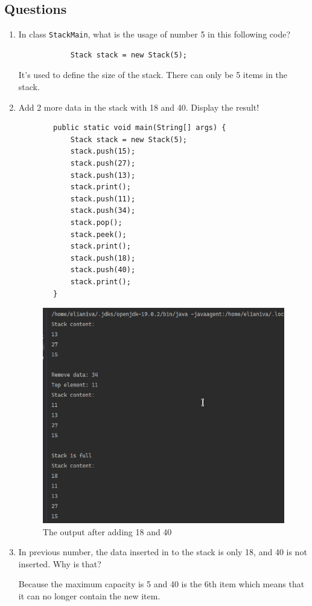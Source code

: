 \documentclass[12pt,titlepage]{article}
\begin{document}
\subsection{Questions}
\begin{enumerate}
    \item {
        In class \texttt{StackMain}, what is the usage of number 5 in this following code?

        \begin{verbatim}
            Stack stack = new Stack(5);
        \end{verbatim}

        It's used to define the size of the stack. There can only be 5 items in the stack.
    }
    \item {
        Add 2 more data in the stack with 18 and 40. Display the result!

        \begin{verbatim}
        public static void main(String[] args) {
            Stack stack = new Stack(5);
            stack.push(15);
            stack.push(27);
            stack.push(13);
            stack.print();
            stack.push(11);
            stack.push(34);
            stack.pop();
            stack.peek();
            stack.print();
            stack.push(18);
            stack.push(40);
            stack.print();
        }
        \end{verbatim}

        \begin{figure}[h]
            \centering
            \includegraphics[width=.5\textwidth]{./images/q1-2-output.png}
            \caption{The output after adding 18 and 40}
        \end{figure}
    }
    \item {
        In previous number, the data inserted in to the stack is only 18, and 40 is not inserted. Why is that?

        Because the maximum capacity is 5 and 40 is the 6th item which means that it can no longer contain the new item.
    }
\end{enumerate}
\end{document}
